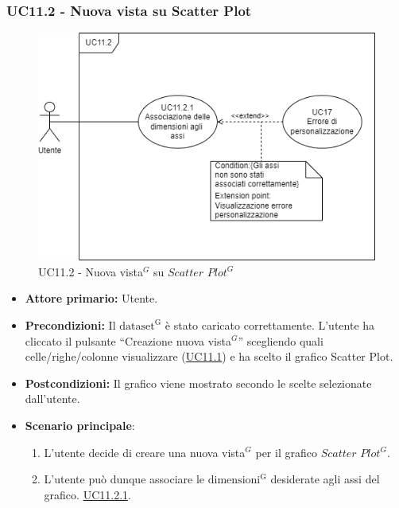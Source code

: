 \subsubsection{UC11.2 - Nuova vista su Scatter Plot}
\label{sec:UC11.2}
\begin{figure}[h!]
	\centering
	\includegraphics[scale=0.60]{../../assets/creazionevista_scatter_plot.png}
	\caption{UC11.2 - Nuova vista$^{G}$ su $Scatter$ $Plot^{G}$}
\end{figure}
\begin{itemize}
    \item \textbf{Attore primario:} Utente.
    \item \textbf{Precondizioni:} Il ${\mathrm{dataset^{G}}}$ è stato caricato correttamente. L'utente ha cliccato il pulsante ``Creazione nuova vista$^{G}$'' scegliendo quali celle/righe/colonne visualizzare (\hyperref[sec:UC11.1]{UC11.1}) e ha scelto il grafico Scatter Plot.
    \item \textbf{Postcondizioni:} Il grafico viene mostrato secondo le scelte selezionate dall'utente.
    \item \textbf{Scenario principale}:
    \begin{enumerate}
		\item L'utente decide di creare una nuova vista$^{G}$ per il grafico $Scatter$ $Plot^{G}$.
		\item L'utente può dunque associare le ${\mathrm{dimensioni^{G}}}$ desiderate agli assi del grafico. \hyperref[sec:UC11.2.1]{UC11.2.1}.
	\end{enumerate}
\end{itemize}


